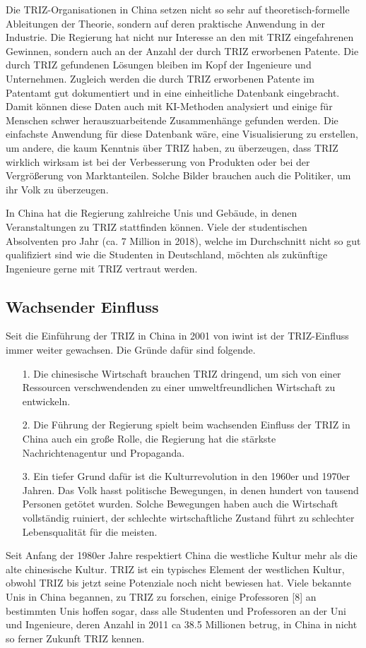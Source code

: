 \documentclass[11pt,a4paper]{article}
\begin{document}
Die TRIZ-Organisationen in China setzen nicht so sehr auf theoretisch-formelle
Ableitungen der Theorie, sondern auf deren praktische Anwendung in der
Industrie.  Die Regierung hat nicht nur Interesse an den mit TRIZ
eingefahrenen Gewinnen, sondern auch an der Anzahl der durch TRIZ erworbenen
Patente. Die durch TRIZ gefundenen Lösungen bleiben im Kopf der Ingenieure und
Unternehmen. Zugleich werden die durch TRIZ erworbenen Patente im Patentamt
gut dokumentiert und in eine einheitliche Datenbank eingebracht. Damit können
diese Daten auch mit KI-Methoden analysiert und einige für Menschen schwer
herauszuarbeitende Zusammenhänge gefunden werden. Die einfachste Anwendung für
diese Datenbank wäre, eine Visualisierung zu erstellen, um andere, die kaum
Kenntnis über TRIZ haben, zu überzeugen, dass TRIZ wirklich wirksam ist bei
der Verbesserung von Produkten oder bei der Vergrößerung von Marktanteilen.
Solche Bilder brauchen auch die Politiker, um ihr Volk zu überzeugen.

In China hat die Regierung zahlreiche Unis und Gebäude, in denen
Veranstaltungen zu TRIZ stattfinden können. Viele der studentischen
Absolventen pro Jahr (ca. 7 Million in 2018), welche im Durchschnitt nicht so
gut qualifiziert sind wie die Studenten in Deutschland, möchten als zukünftige
Ingenieure gerne mit TRIZ vertraut werden.
  
\subsection{Wachsender Einfluss}

Seit die Einführung der TRIZ in China in 2001 von iwint ist der TRIZ-Einfluss
immer weiter gewachsen. Die Gründe dafür sind folgende.
\begin{itemize}
\item [1.] Die chinesische Wirtschaft brauchen TRIZ dringend, um sich von
  einer Ressourcen verschwendenden zu einer umweltfreundlichen Wirtschaft zu
  entwickeln.
\item [2.] Die Führung der Regierung spielt beim wachsenden Einfluss der TRIZ
  in China auch ein große Rolle, die Regierung hat die stärkste
  Nachrichtenagentur und Propaganda.
\item [3.] Ein tiefer Grund dafür ist die Kulturrevolution in den 1960er und
  1970er Jahren. Das Volk hasst politische Bewegungen, in denen hundert von
  tausend Personen getötet wurden. Solche Bewegungen haben auch die Wirtschaft
  vollständig ruiniert, der schlechte wirtschaftliche Zustand führt zu
  schlechter Lebensqualität für die meisten.
\end{itemize}
Seit Anfang der 1980er Jahre respektiert China die westliche Kultur mehr als
die alte chinesische Kultur. TRIZ ist ein typisches Element der westlichen
Kultur, obwohl TRIZ bis jetzt seine Potenziale noch nicht bewiesen hat. Viele
bekannte Unis in China begannen, zu TRIZ zu forschen, einige Professoren [8]
an bestimmten Unis hoffen sogar, dass alle Studenten und Professoren an der
Uni und Ingenieure, deren Anzahl in 2011 ca 38.5 Millionen betrug, in China in
nicht so ferner Zukunft TRIZ kennen.
\end{document}
